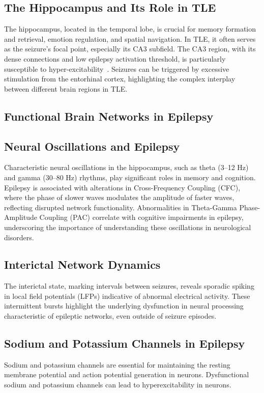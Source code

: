 \subsection{The Hippocampus and Its Role in TLE}
The hippocampus, located in the temporal lobe, is crucial for memory formation 
and retrieval, emotion regulation, and spatial navigation. In TLE, it often 
serves as the seizure's focal point, especially its CA3 subfield. The CA3 region, 
with its dense connections and low epilepsy activation threshold, is particularly 
susceptible to hyper-excitability~\parencite{witterIntrinsicExtrinsicWiring2007}. Seizures can be 
triggered by excessive stimulation from the entorhinal cortex, highlighting the 
complex interplay between different brain regions in TLE\@.

\subsection{Functional Brain Networks in Epilepsy}


\subsection{Neural Oscillations and Epilepsy}
Characteristic neural oscillations in the hippocampus, such as theta (3--12 Hz) 
and gamma (30--80 Hz) rhythms, play significant roles in memory and cognition. 
Epilepsy is associated with alterations in Cross-Frequency Coupling (CFC), where 
the phase of slower waves modulates the amplitude of faster waves, reflecting 
disrupted network functionality. Abnormalities in Theta-Gamma Phase-Amplitude 
Coupling (PAC) correlate with cognitive impairments in epilepsy, underscoring 
the importance of understanding these oscillations in neurological disorders.

\subsection{Interictal Network Dynamics}
The interictal state, marking intervals between seizures, reveals sporadic 
spiking in local field potentials (LFPs) indicative of abnormal electrical 
activity. These intermittent bursts highlight the underlying dysfunction in 
neural processing characteristic of epileptic networks, even outside of 
seizure episodes.

\subsection{Sodium and Potassium Channels in Epilepsy}
Sodium and potassium channels are essential for maintaining the resting
membrane potential and action potential generation in neurons.
Dysfunctional sodium and potassium channels can lead to hyperexcitability in neurons.
